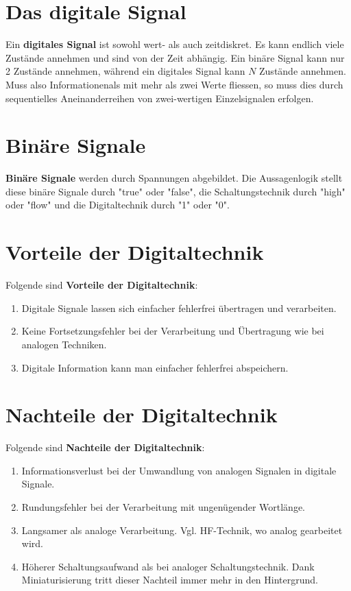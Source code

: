 \section{Das digitale Signal}
Ein {\color{red}\textbf{digitales Signal}} ist sowohl wert- als auch zeitdiskret. Es kann endlich viele Zustände annehmen und sind von der Zeit abhängig. Ein binäre Signal kann nur 2 Zustände annehmen, während ein digitales Signal kann $N$ Zustände annehmen. Muss also Informationenals mit mehr als zwei Werte fliessen, so muss dies durch sequentielles Aneinanderreihen von zwei-wertigen Einzelsignalen erfolgen.
\section{Binäre Signale}
{\color{red}\textbf{Binäre Signale}} werden durch Spannungen abgebildet. Die Aussagenlogik stellt diese binäre Signale durch "true" oder "false", die Schaltungstechnik durch "high" oder "flow" und die Digitaltechnik durch "1" oder "0".
\section{Vorteile der Digitaltechnik}
Folgende sind {\color{red}\textbf{Vorteile der Digitaltechnik}}: 
\begin{enumerate}[$(1)$]
\item Digitale Signale lassen sich einfacher fehlerfrei übertragen und verarbeiten. 
\item Keine Fortsetzungsfehler bei der Verarbeitung und Übertragung wie bei analogen Techniken. 
\item Digitale Information kann man einfacher fehlerfrei abspeichern.
\end{enumerate}
\section{Nachteile der Digitaltechnik}
Folgende sind {\color{red}\textbf{Nachteile der Digitaltechnik}}: 
\begin{enumerate}[$(1)$]
\item Informationsverlust bei der Umwandlung von analogen Signalen in digitale Signale. 
\item Rundungsfehler bei der Verarbeitung mit ungenügender Wortlänge. 
\item Langsamer als analoge Verarbeitung. Vgl. HF-Technik, wo analog gearbeitet wird. 
\item Höherer Schaltungsaufwand als bei analoger Schaltungstechnik. Dank Miniaturisierung tritt dieser Nachteil immer mehr in den Hintergrund.
\end{enumerate}